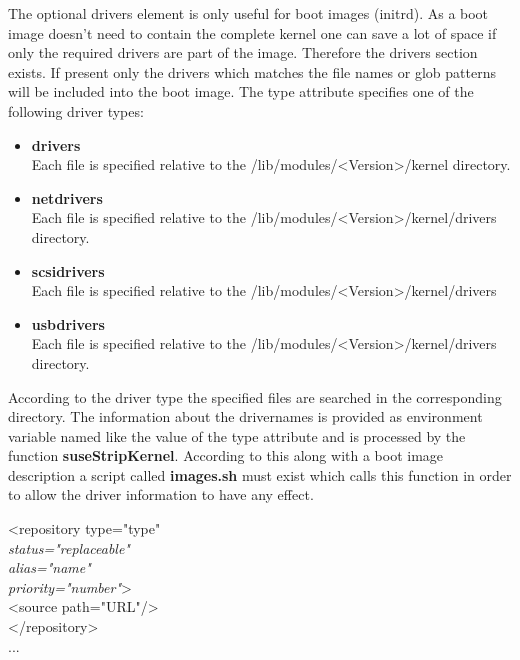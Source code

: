 The optional drivers element is only useful for boot images (initrd).
As a boot image doesn't need to contain the complete kernel one can
save a lot of space if only the required drivers are part of the image.
Therefore the drivers section exists. If present only the drivers which
matches the file names or glob patterns will be included into the
boot image. The type attribute specifies one of the following driver
types:

\begin{itemize}
\item \textbf{drivers}\\
      Each file is specified relative to the
      /lib/modules/<Version>/kernel directory.
\item \textbf{netdrivers}\\
      Each file is specified relative to the
      /lib/modules/<Version>/kernel/drivers
      directory.
\item \textbf{scsidrivers}\\
      Each file is specified relative to the
      /lib/modules/<Version>/kernel/drivers
\item \textbf{usbdrivers}\\
      Each file is specified relative to the
      /lib/modules/<Version>/kernel/drivers directory.
\end{itemize}

According to the driver type the specified files are searched in
the corresponding directory. The information about the drivernames
is provided as environment variable named like the value of
the type attribute and is processed by the function
\textbf{suseStripKernel}. According to this along with a boot image
description a script called \textbf{images.sh} must exist which
calls this function in order to allow the driver information to
have any effect.


\begin{Command}{12cm}
<repository type="type"\\
\hspace*{1cm}\textit{status="replaceable"}\\
\hspace*{1cm}\textit{alias="name"}\\
\hspace*{1cm}\textit{priority="number"}>\\
\hspace*{2cm}<source path="URL"/>\\
</repository>\\
...
\end{Command}

